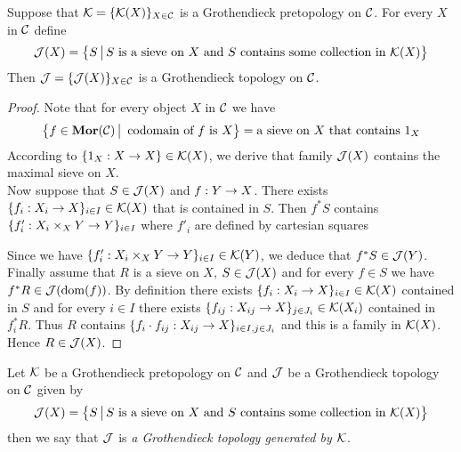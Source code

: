 \begin{proposition}
Suppose that ${\mathcal K}=\{{\mathcal K}(X)\}_{X\in {\mathcal C}}$ is a Grothendieck pretopology on ${\mathcal C}$. For every $X$ in ${\mathcal C}$ define 
$${\mathcal J}(X)=\big\{S\,\big|\,S\mbox{ is a sieve on }X\mbox{ and }S\mbox{ contains some collection in }{\mathcal K}(X)\big\}$$
Then ${\mathcal J}=\{{\mathcal J}(X)\}_{X\in {\mathcal C}}$ is a Grothendieck topology on ${\mathcal C}$.
\end{proposition}
\begin{proof}
Note that for every object $X$ in ${\mathcal C}$ we have
$$\big\{f\in \mathbf{Mor}({\mathcal C})\,\big|\,\mbox{ codomain of }f\mbox{ is }X\big\}=\mbox{a sieve on }X\mbox{ that contains }1_X$$
According to $\{1_X:X\rightarrow X\}\in {\mathcal K}(X)$, we derive that family ${\mathcal J}(X)$ contains the maximal sieve on $X$.\\
Now suppose that $S\in {\mathcal J}(X)$ and $f:Y\rightarrow X$. There exists $\{f_i:X_i\rightarrow X\}_{i\in I}\in {\mathcal K}(X)$ that is contained in $S$. Then $f^*S$ contains $\{f'_i:X_i\times_XY\rightarrow Y\}_{i\in I}$ where $f'_i$ are defined by cartesian squares
\begin{center}
\end{center}
Since we have $\{f'_i:X_i\times_XY\rightarrow Y\}_{i\in I}\in {\mathcal K}(Y)$, we deduce that $f^*S\in {\mathcal J}(Y)$.\\
Finally assume that $R$ is a sieve on $X$, $S\in {\mathcal J}(X)$ and for every $f\in S$ we have $f^*R\in {\mathcal J}(\mathrm{dom}(f))$. By definition there exists $\{f_i:X_i\rightarrow X\}_{i\in I}\in {\mathcal K}(X)$ contained in $S$ and for every $i\in I$ there exists $\{f_{ij}:X_{ij}\rightarrow X\}_{j\in J_i}\in {\mathcal K}(X_i)$ contained in $f_i^*R$. Thus $R$ contains $\{f_i\cdot f_{ij}:X_{ij}\rightarrow X\}_{i\in I,j\in J_i}$ and this is a family in ${\mathcal K}(X)$. Hence $R\in {\mathcal J}(X)$.
\end{proof}

\begin{definition}
Let ${\mathcal K}$ be a Grothendieck pretopology on ${\mathcal C}$ and ${\mathcal J}$ be a Grothendieck topology on ${\mathcal C}$ given by 
$${\mathcal J}(X)=\big\{S\,\big|\,S\mbox{ is a sieve on }X\mbox{ and }S\mbox{ contains some collection in }{\mathcal K}(X)\big\}$$
then we say that ${\mathcal J}$ is \textit{a Grothendieck topology generated by ${\mathcal K}$}.
\end{definition}

